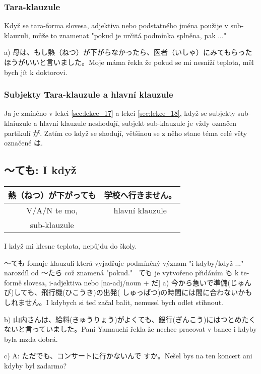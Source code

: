\subsubsection{Tara-klauzule}
Když se tara-forma slovesa, adjektiva nebo podstatného jména použije v sub-klauzuli, může to znamenat "pokud je určitá podmínka splněna, pak ..."


a) 母は、もし熱（ねつ）が下がらなかったら、医者（いしゃ）にみてもらったほうがいいと言いました。Moje máma řekla že pokud se mi nesníží teplota, měl bych jít k doktorovi.


\subsubsection{Subjekty Tara-klauzule a hlavní klauzule}
Ja je zmíněno v lekci \ref{sec:lekce_17} a lekci \ref{sec:lekce_18}, když se subjekty sub-klaiuzule a hlavní klauzule neshodují, subjekt sub-klauzule je vždy označen partikulí が. Zatím co když se shodují, většinou se z něho stane téma celé věty označené は.

\subsection{〜ても: I když}

\begin{center}
\begin{tabular}{|| c || c ||}
\hline
熱（ねつ）が下がっても& 学校へ行きません。\\
\hline
V/A/N te mo,& hlavní klauzule\\
sub-klauzule&\\
\hline
\end{tabular}
\end{center}
I když mi klesne teplota, nepůjdu do školy.


〜ても fomuje klauzuli která vyjadřuje podmíněný význam "i kdyby/když ..." narozdíl od 〜たら což znamená "pokud." ~ても je vytvořeno přidáním も k te-formě slovesa, i-adjektiva nebo  [na-adj/noun + だ]
a) 今から急いで準備(じゅんび)しても、飛行機(ひこうき)の出発( しゅっぱつ)の時間には間に合わないかもしれません。I kdybych si teď začal balit, nemusel bych odlet stihnout.

b) 山内さんは、給料(きゅうりょう)がよくても、銀行(ぎんこう)にはつとめたくないと言っていました。Paní Yamauchi řekla že nechce pracovat v bance i kdyby byla mzda dobrá.




c) A: ただでも、コンサートに行かないんで すか。Nešel bys na ten koncert ani kdyby byl zadarmo?

